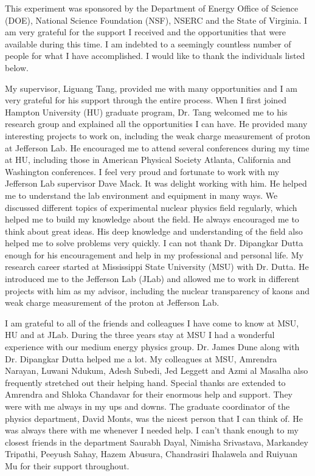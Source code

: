 
This experiment was sponsored by the Department of Energy Office of Science (DOE), National Science Foundation (NSF), NSERC and the State of Virginia. I am very grateful for the support I received and the opportunities that were available during this time. I am indebted to a seemingly countless number of people for what I have accomplished. I would like to thank the individuals listed below.

My supervisor, Liguang Tang, provided me with many opportunities and I am very grateful for his support through the entire process. When I first joined Hampton University (HU) graduate program, Dr. Tang welcomed me to his research group and explained all the opportunities I can have. He provided many interesting projects to work on, including the weak charge measurement of proton at Jefferson Lab. He encouraged me to attend several conferences during my time at HU, including those in American Physical Society Atlanta, California and Washington conferences. I feel very proud and fortunate to work with my Jefferson Lab supervisor Dave Mack. It was delight working with him. He helped me to understand the lab environment and equipment in many ways. We discussed different topics of experimental nuclear physics field regularly, which helped me to build my knowledge about the field. He always encouraged me to think about great ideas. His deep knowledge and understanding of the field also helped me to solve problems very quickly. I can not thank Dr. Dipangkar Dutta enough for his encouragement and help in my professional and personal life. My research career started at Mississippi State University (MSU) with Dr. Dutta. He introduced me to the Jefferson Lab (JLab) and allowed me to work in different projects with him as my advisor, including the nuclear transparency of kaons and weak charge measurement of the proton at Jefferson Lab. 

I am grateful to all of the friends and colleagues I have come to know at MSU, HU and at JLab. During the three years stay at MSU I had a wonderful experience with our medium energy physics group. Dr. James Dune along with Dr. Dipangkar Dutta helped me a lot. My colleagues at MSU, Amrendra Narayan, Luwani Ndukum, Adesh Subedi, Jed Leggett and Azmi al Masalha also frequently stretched out their helping hand. Special thanks are extended to Amrendra and Shloka Chandavar for their enormous help and support. They were with me always in my ups and downs. The graduate coordinator of the physics department, David Monts, was the nicest person that I can think of. He was always there with me whenever I needed help. I can't thank enough to my closest friends in the department Saurabh Dayal, Nimisha Srivastava, Markandey Tripathi, Peeyush Sahay, Hazem Abusura, Chandrasiri Ihalawela and Ruiyuan Mu for their support throughout.


